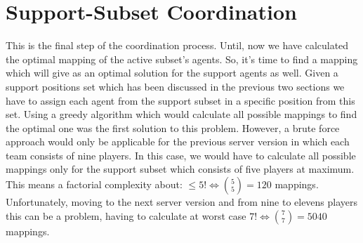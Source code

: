 \section{Support-Subset Coordination}
This is the final step of the coordination process. Until, now we have calculated the optimal mapping of the active subset's agents. So, it's time to find a mapping which will give as an optimal solution for the support agents as well. Given a support positions set which has been discussed in the previous two sections we have to assign each agent from the support subset in a specific position from this set. Using a greedy algorithm which would calculate all possible mappings to find the optimal one was the first solution to this problem. However, a brute force approach would only be applicable for the previous server version in which each team consists of nine players. In this case, we would have to calculate all possible mappings only for the support subset which consists of five players at maximum. 
This means a factorial complexity about: $\leqslant 5! \Leftrightarrow  {{5}\choose{5}} = 120$ mappings. Unfortunately, moving to the next server version and from nine to elevens players this can be a problem, having to calculate at worst case $ 7! \Leftrightarrow  {{7}\choose{7}} = 5040$ mappings. 

